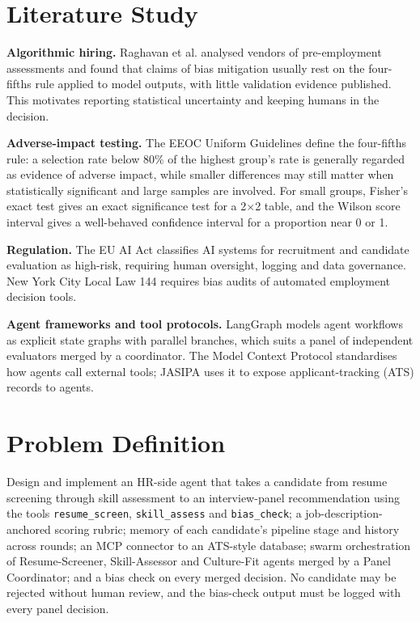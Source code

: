 \section{Literature Study}
\justify
\textbf{Algorithmic hiring.} Raghavan et al. \cite{raghavan2020} analysed vendors of pre-employment assessments and found that claims of bias mitigation usually rest on the four-fifths rule applied to model outputs, with little validation evidence published. This motivates reporting statistical uncertainty and keeping humans in the decision.

\textbf{Adverse-impact testing.} The EEOC Uniform Guidelines \cite{eeoc1978} define the four-fifths rule: a selection rate below 80\% of the highest group's rate is generally regarded as evidence of adverse impact, while smaller differences may still matter when statistically significant and large samples are involved. For small groups, Fisher's exact test \cite{fisher1922} gives an exact significance test for a 2$\times$2 table, and the Wilson score interval \cite{wilson1927} gives a well-behaved confidence interval for a proportion near 0 or 1.

\textbf{Regulation.} The EU AI Act \cite{euaiact2024} classifies AI systems for recruitment and candidate evaluation as high-risk, requiring human oversight, logging and data governance. New York City Local Law 144 \cite{nyc144} requires bias audits of automated employment decision tools.

\textbf{Agent frameworks and tool protocols.} LangGraph \cite{langgraph} models agent workflows as explicit state graphs with parallel branches, which suits a panel of independent evaluators merged by a coordinator. The Model Context Protocol \cite{mcp2024} standardises how agents call external tools; JASIPA uses it to expose applicant-tracking (ATS) records to agents.

\section{Problem Definition}
\justify
Design and implement an HR-side agent that takes a candidate from resume screening through skill assessment to an interview-panel recommendation using the tools \texttt{resume\_screen}, \texttt{skill\_assess} and \texttt{bias\_check}; a job-description-anchored scoring rubric; memory of each candidate's pipeline stage and history across rounds; an MCP connector to an ATS-style database; swarm orchestration of Resume-Screener, Skill-Assessor and Culture-Fit agents merged by a Panel Coordinator; and a bias check on every merged decision. No candidate may be rejected without human review, and the bias-check output must be logged with every panel decision.

